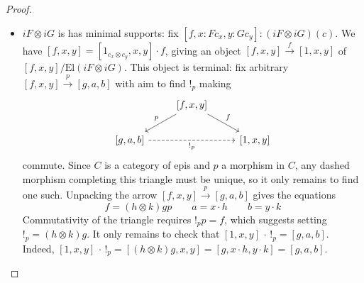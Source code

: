 \documentclass[
  sigconf,
  screen, ]{acmart}
\theoremstyle{definition}
\newcommand\nref[2]{\hyperref[#1]{#2}} \newcommand\checkhigh{{\huge{\color{red}\textbf{TODO: check}}}}
\newcommand\catelts{{\nref{def:catelts}{\mathrm{El}}}}
\begin{document}
\begin{proof}
\begin{itemize}
    The equivalence class $[\overline f, x, y]$
    is an element of $(iF\otimes iG)( c)$
    satisfying
      $[\overline f, x, y]\cdot p
      = [f,x,y]$.
    It only remains to show that it is the unique such.
    Suppose $[g,a,b]\cdot p = [gp,a,b] = [f,x,y]$,
    so $(f,x,y) \sim (gp,a,b)$, so
    there exist isos $h,k$ with
    \[ f = (h\otimes k)gp
    \qquad\text{and}\qquad
       a = x\cdot h
       \qquad\text{and}\qquad 
       b = y\cdot k. \]
    Then $(h\otimes k)gp = f = \overline fp$,
    so $(h\otimes k)g = \overline f$ by $p$ epi,
    so
    \[ [g,a,b] = [g,x\cdot h,y\cdot k] = [(h\otimes k)g,x,y] = [\overline f,x,y]\]
    establishing uniqueness of $[\overline f,x,y]$.
  \item $iF\otimes iG$ is has minimal supports:
    fix $[f,x:F c_x,y:G c_y] : (iF\otimes iG)( c)$.
    We have $[f,x,y] = [1_{ c_x\otimes  c_y}, x, y]\cdot f$,
    giving an object
    $[f,x, y] \xrightarrow f [1, x, y]$
    of $[f,x,y]/\catelts(iF\otimes iG)$.
    This object is terminal: fix arbitrary
    $[f,x,y] \xrightarrow p [g,a,b]$
    with aim to find $!_p$ making
    \[
\begin{tikzcd}
  & {[f,x,y]} \arrow[ld, "p"'] \arrow[rd, "f"] &           \\
{[g,a,b]} \arrow[rr, "!_p"', dashed] &                                            & {[1,x,y]}
\end{tikzcd}
      \]
    commute.
    Since $C$ is a category of epis and $p$ a morphism in $C$,
    any dashed morphism completing this triangle must be unique,
    so it only remains to find one such.
    Unpacking the arrow $[f,x,y] \xrightarrow p[g,a,b]$ gives the equations
    \[ f = (h\otimes k)gp \qquad a = x\cdot h \qquad b = y\cdot k \]
    Commutativity of the triangle requires $!_pp = f$,
    which suggests setting $!_p = (h\otimes k)g$.
    It only remains to check that
    $[1,x,y] \,\cdot\, !_p = [g,a,b]$.
    Indeed, $[1,x,y]\,\cdot\, !_p = [(h\otimes k)g, x, y] = [g,x\cdot h,y\cdot k] = [g,a,b]$.
  \end{itemize}
\end{proof}
\end{document}
